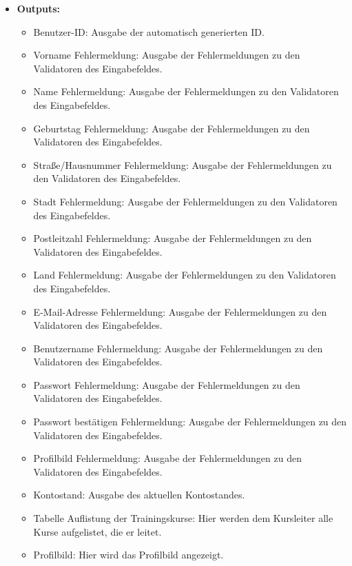 \begin{itemize}
				
			\item \textbf{Outputs:}
				\begin{itemize}
					\item Benutzer-ID: Ausgabe der automatisch generierten ID.
					\item Vorname Fehlermeldung: Ausgabe der Fehlermeldungen zu den Validatoren des Eingabefeldes.
					\item Name Fehlermeldung: Ausgabe der Fehlermeldungen zu den Validatoren des Eingabefeldes.
					\item Geburtstag Fehlermeldung: Ausgabe der Fehlermeldungen zu den Validatoren des Eingabefeldes.
					\item Straße/Hausnummer Fehlermeldung: Ausgabe der Fehlermeldungen zu den Validatoren des Eingabefeldes.
					\item Stadt Fehlermeldung: Ausgabe der Fehlermeldungen zu den Validatoren des Eingabefeldes.
					\item Postleitzahl Fehlermeldung: Ausgabe der Fehlermeldungen zu den Validatoren des Eingabefeldes.
					\item Land Fehlermeldung: Ausgabe der Fehlermeldungen zu den Validatoren des Eingabefeldes.
					\item E-Mail-Adresse Fehlermeldung: Ausgabe der Fehlermeldungen zu den Validatoren des Eingabefeldes.
					\item Benutzername Fehlermeldung: Ausgabe der Fehlermeldungen zu den Validatoren des Eingabefeldes.
					\item Passwort Fehlermeldung: Ausgabe der Fehlermeldungen zu den Validatoren des Eingabefeldes.
					\item Passwort bestätigen Fehlermeldung: Ausgabe der Fehlermeldungen zu den Validatoren des Eingabefeldes.
					\item Profilbild Fehlermeldung: Ausgabe der Fehlermeldungen zu den Validatoren des Eingabefeldes.
					\item Kontostand: Ausgabe des aktuellen Kontostandes.
					\item Tabelle Auflistung der Trainingskurse: Hier werden dem Kursleiter alle Kurse aufgelistet, die er leitet.
					\item Profilbild: Hier wird das Profilbild angezeigt.
				\end{itemize}
				
				\begin{center}
					\begin{longtable}{|p{5cm} | p{4cm}|p{3cm}|}
						

\end{longtable}
\end{center}
\end{itemize}
